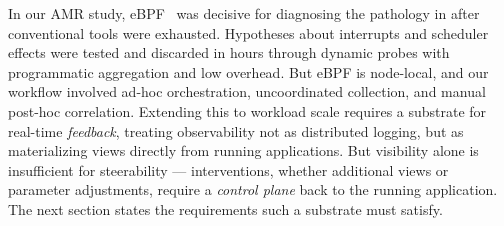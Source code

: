In our AMR study, eBPF~\cite{:eBPF} was decisive for diagnosing the pathology in
 after conventional
tools were exhausted.
Hypotheses about interrupts and scheduler effects were tested and discarded in hours through
dynamic probes with programmatic aggregation and low overhead.
But eBPF is node-local, and our workflow involved ad-hoc orchestration, uncoordinated collection,
and manual post-hoc correlation.
Extending this to workload scale requires a substrate for real-time \emph{feedback}, treating
observability not as distributed logging, but as materializing views directly from running
applications.
But visibility alone is insufficient for steerability --- interventions, whether additional views
or parameter adjustments, require a \emph{control plane} back to the running application.
The next section states the requirements such a substrate must satisfy.
 











